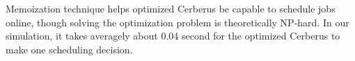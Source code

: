 
Memoization technique helps optimized Cerberus be capable to schedule jobs online,
though solving the optimization problem is theoretically NP-hard.
In our simulation, it takes averagely about 0.04 second for the optimized 
Cerberus to make one scheduling decision.



